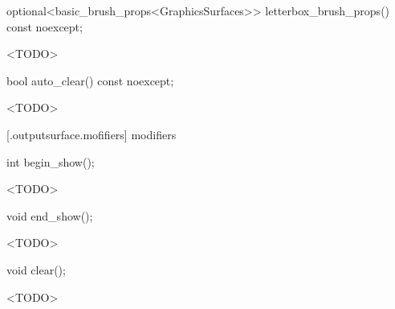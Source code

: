 %
\begin{itemdecl}
optional<basic_brush_props<GraphicsSurfaces>> letterbox_brush_props() const noexcept;
\end{itemdecl}
\begin{itemdescr}
\pnum
\returns
<TODO>
\end{itemdescr}

%
\begin{itemdecl}
bool auto_clear() const noexcept;
\end{itemdecl}
\begin{itemdescr}
\pnum
\returns
<TODO>
\end{itemdescr}

 [\iotwod.outputsurface.mofifiers] { modifiers}

%
\begin{itemdecl}
int begin_show();
\end{itemdecl}
\begin{itemdescr}
\pnum
\effects
<TODO>
\end{itemdescr}

%
\begin{itemdecl}
void end_show();
\end{itemdecl}
\begin{itemdescr}
\pnum
\effects
<TODO>
\end{itemdescr}

%
\begin{itemdecl}
void clear();
\end{itemdecl}
\begin{itemdescr}
\pnum
\effects
<TODO>
\end{itemdescr}

